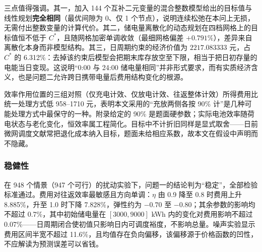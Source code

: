 三点值得强调。其一，加入 144 个互补二元变量的混合整数模型给出的目标值与线性规划\textbf{完全相同}（最优间隙为 0、仅 1 个节点），说明连续松弛在本问上无损，无需付出整数变量的计算代价。其二，储电量离散化的动态规划在四档网格上的目标值恒不低于 $C^{*}$，且随网格加密单调收敛（最细网格偏差 $+0.791\%$），差异来自离散化本身而非模型结构。其三，日周期约束的经济价值为 $2217.083333$ 元，占 $C^{*}$ 的 6.312\%：去掉该约束后模型会把期末库存放空至下限，相当于把日初存量的电能当日变现。这说明“0:00 与 24:00 储电量相同”并非形式要求，而有实质经济含义，也是问题二允许跨日携带电量后费用结构变化的根源。

效率作用位置的三组对照（仅充电计效、仅放电计效、往返整体计效）所得费用比统一处理方式低 958--1710 元，表明本文采用的“充放两侧各按 90\% 计”是几种可能处理方式中最保守的一种。附录给定的 90\% 是题面硬参数；实际电池效率随荷电状态与老化变化，恒效率属工程简化\cite{ref-vykhodtsev-2022-bess-review,ref-huang-2022-dynamic-efficiency}。目标中不计折旧同样是显式取舍——日前微网调度文献常把退化成本纳入目标\cite{ref-zhang-2015-dayahead-degradation}，题面未给相应系数，故本文在假设中声明而不隐藏。

\subsubsection{稳健性}

在 948 个情景（947 个可行）的扰动实验下，问题一的结论判为“稳定”，全部检验标准通过。费用对往返效率最敏感且方向单调：$\eta$ 由 0.9 降至 0.8 时费用上升 8.885\%，升至 1.0 时下降 7.828\%，弹性约为 $-0.70$ 至 $-0.80$；其余参数的影响均不超过 0.7\%，其中初始储电量在 $[3000,9000]$ kWh 内的变化对费用影响不超过 0.07\%——日周期闭合使初值只影响日内可调度裕度，不影响总量。噪声实验显示费用区间半宽不超过 11.6\%，且均值存在负向偏移，该偏移源于价格函数的凹性，不应解读为预测误差可以省钱。

